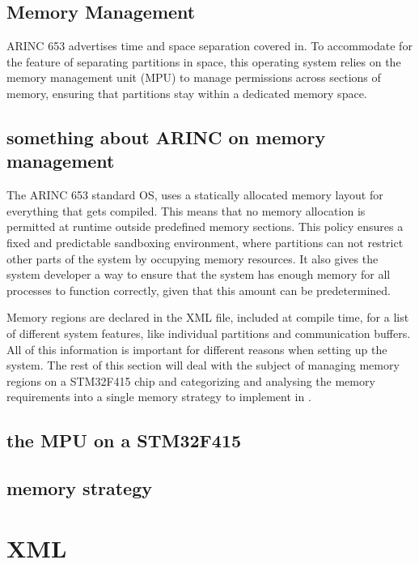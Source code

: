 \subsection{Memory Management}
ARINC 653 advertises time and space separation covered in.
To accommodate for the feature of separating partitions in space,
this operating system relies on the memory management unit (MPU)
to manage permissions across sections of memory,
ensuring that partitions stay within a dedicated memory space.

\subsection{something about ARINC on memory management}
The ARINC 653 standard OS, uses a statically allocated memory layout for everything
that gets compiled.
This means that no memory allocation is permitted at runtime
outside predefined memory sections.
This policy ensures a fixed and predictable sandboxing environment, where partitions
can not restrict other parts of the system by occupying memory resources.
It also gives the system developer a way to ensure that the system has enough memory
for all processes to function correctly, given that this amount can be predetermined.

Memory regions are declared in the XML file, included at compile time, for a list
of different system features, like individual partitions and communication buffers.
All of this information is important for different reasons when setting up the system.
The rest of this section will deal with the subject of managing memory regions on a STM32F415 chip
and categorizing and analysing the memory requirements into a single memory strategy to implement in
.

\subsection{the MPU on a STM32F415}

\subsection{memory strategy}

\section{XML}

